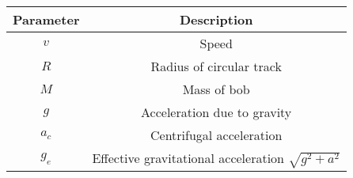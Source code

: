 \begin{tabular}{ | c | c | }
    \hline
    Parameter & Description \\
    \hline
    $v$ & Speed \\
    \hline
    $R$ & Radius of circular track \\
    \hline
    $M$ & Mass of bob \\
    \hline
    $g$ & Acceleration due to gravity \\
    \hline
    $a_c$ & Centrifugal acceleration \\
    \hline
    $g_e$ & Effective gravitational acceleration $\sqrt{g^2 + a^2}$ \\
    \hline
\end{tabular}